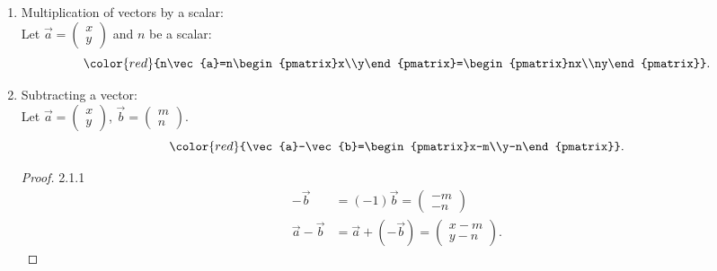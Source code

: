 \documentclass[12pt, a4paper]{article}
\begin{document}
\begin{enumerate}
\begin{itemize}
\begin{example}{2.1.2}{}
\begin{figure}[H]
      \end{figure}
    \end{example}
    \item Let $\vec{a}=\begin{pmatrix}x\\y\end{pmatrix}$ and $\vec{b}=\begin{pmatrix}m\\n\end{pmatrix}$
    $${\color{red}{\vec{a}+\vec{b}=\begin{pmatrix}x+m\\y+n\end{pmatrix}}}.$$
  \end{itemize}
  \item Multiplication of vectors by a scalar: \\
  Let $\vec{a}=\begin{pmatrix}x\\y\end{pmatrix}$ and $n$ be a scalar: 
  $${\color{red}{n\vec{a}=n\begin{pmatrix}x\\y\end{pmatrix}=\begin{pmatrix}nx\\ny\end{pmatrix}}}.$$
  {}
  \item Subtracting a vector: \\
  Let $\vec{a}=\begin{pmatrix}x\\y\end{pmatrix}$, $\vec{b}=\begin{pmatrix}m\\n\end{pmatrix}$.
  $${\color{red}{\vec{a}-\vec{b}=\begin{pmatrix}x-m\\y-n\end{pmatrix}}}.$$
  \begin{proof}{2.1.1}{}
    $$\begin{aligned}
      -\vec{b}&=(-1)\vec{b}=\begin{pmatrix}-m\\-n\end{pmatrix}\\
      \vec{a}-\vec{b}&=\vec{a}+\left(-\vec{b}\right)=\begin{pmatrix}x-m\\y-n\end{pmatrix}.

\end{aligned}$$
\end{proof}
\end{enumerate}
\end{document}
